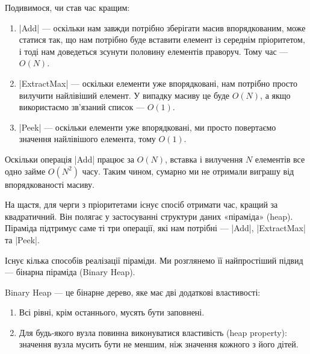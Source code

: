 \documentclass[12pt,a4paper]{report}
\begin{document}
Подивимося, чи став час кращим:

\begin{enumerate}
    \item |Add| --- оскільки нам завжди потрібно зберігати масив впорядкованим, може статися так, що нам потрібно буде вставити елемент із середнім пріоритетом, і тоді нам доведеться зсунути половину елементів праворуч. Тому час --- \(O(N)\).
    \item |ExtractMax| --- оскільки елементи уже впорядковані, нам потрібно просто вилучити найлівіший елемент. У випадку масиву це буде \(O(N)\), а якщо використаємо зв’язаний список --- \(O(1)\).
    \item |Peek| --- оскільки елементи уже впорядковані, ми просто повертаємо значення найлівішого елемента, тому \(O(1)\).
\end{enumerate}

Оскільки операція |Add| працює за \(O(N)\), вставка і вилучення \(N\) елементів все одно займе \(O(N^2)\) часу. Таким чином, сумарно ми не отримали виграшу від впорядкованості масиву.

На щастя, для черги з пріоритетами існує спосіб отримати час, кращий за квадратичний. Він полягає у застосуванні структури даних «піраміда» (heap). Піраміда підтримує саме ті три операції, які нам потрібні --- |Add|, |ExtractMax| та |Peek|.

Існує кілька способів реалізації піраміди. Ми розглянемо її найпростіший підвид --- бінарна піраміда (Binary Heap).

Binary Heap --- це бінарне дерево, яке має дві додаткові властивості:

\begin{enumerate}
    \item Всі рівні, крім останнього, мусять бути заповнені.
    \item Для будь-якого вузла повинна виконуватися властивість (heap property): значення вузла мусить бути не меншим, ніж значення кожного з його дітей.
\end{enumerate}
\end{document}
